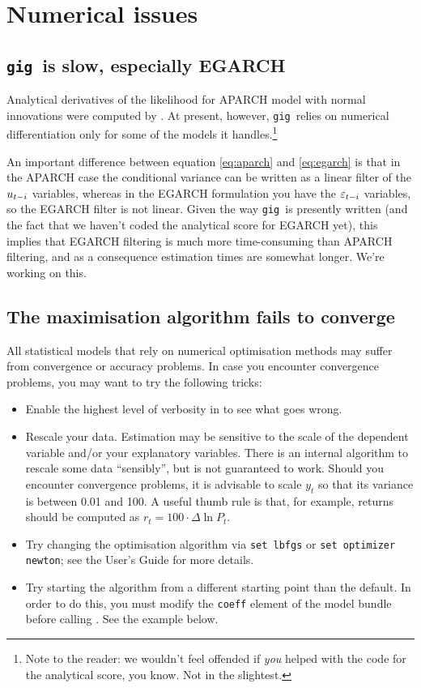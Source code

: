 \documentclass[a4paper,11pt]{article}
\newcommand{\dtk}[1]{\texttt{\detokenize{#1}}}
\newcommand{\stdu}{\ensuremath \varepsilon}
\newcommand{\uhat}{\ensuremath u}
\newcommand{\gig}{\texttt{gig}}
\begin{document}
\section{Numerical issues}
\label{sec:numerical}

\subsection{\gig\ is slow, especially EGARCH}
Analytical derivatives of the likelihood for APARCH model with normal
innovations were computed by \cite{Laurent}. At present, however,
\gig\ relies on numerical differentiation only for some of the models
it handles.\footnote{Note to the reader: we wouldn't feel offended if
  \emph{you} helped with the code for the analytical score, you
  know. Not in the slightest.}

An important difference between equation \eqref{eq:aparch} and
\eqref{eq:egarch} is that in the APARCH case the conditional variance
can be written as a linear filter of the $\uhat_{t-i}$ variables,
whereas in the EGARCH formulation you have the $\stdu_{t-i}$
variables, so the EGARCH filter is not linear. Given the way \gig\ is
presently written (and the fact that we haven't coded the analytical
score for EGARCH yet), this implies that EGARCH filtering is much more
time-consuming than APARCH filtering, and as a consequence estimation
times are somewhat longer. We're working on this.

\subsection{The maximisation algorithm fails to converge}

All statistical models that rely on numerical optimisation methods may
suffer from convergence or accuracy problems. In case you encounter
convergence problems, you may want to try the following tricks:
\begin{itemize}
\item Enable the highest level of verbosity in
  \dtk{gig_estimate()} to see what goes wrong.
\item Rescale your data. Estimation may be sensitive to the scale of
  the dependent variable and/or your explanatory variables. There is
  an internal algorithm to rescale some data ``sensibly'', but is not
  guaranteed to work. Should you encounter convergence problems, it is
  advisable to scale $y_t$ so that its variance is between 0.01 and
  100. A useful thumb rule is that, for example, returns should be
  computed as $r_t = 100 \cdot \Delta \ln P_t$.
\item Try changing the optimisation algorithm via \texttt{set lbfgs}
  or \texttt{set optimizer newton}; see the User's Guide for more details.
\item Try starting the algorithm from a different starting point than
  the default. In order to do this, you must modify the \texttt{coeff}
  element of the model bundle before calling
  \dtk{gig_estimate}. See the example below.
\end{itemize}
\end{document}
